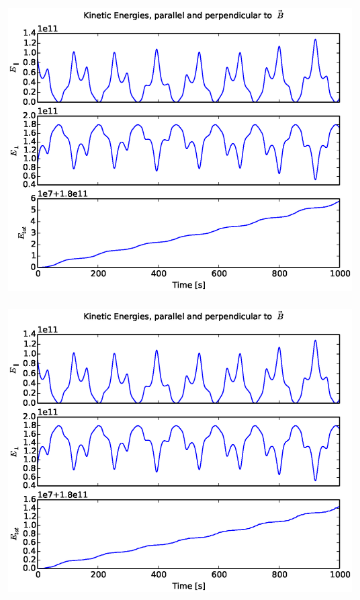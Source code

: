 \documentclass[x11names]{article}
\begin{document}
\begin{figure}
\begin{subfigure}{0.45\textwidth}
        \includegraphics[width = \textwidth]{../source/figures/ion_8_5_Eulerenergy}
      \end{subfigure}
      \begin{subfigure}{0.45\textwidth}
        \includegraphics[width = \textwidth]{../source/figures/ion_8_5_Verletenergy}
      \end{subfigure} 
      \begin{subfigure}{0.45\textwidth}

\end{subfigure}
\end{figure}
\end{document}

